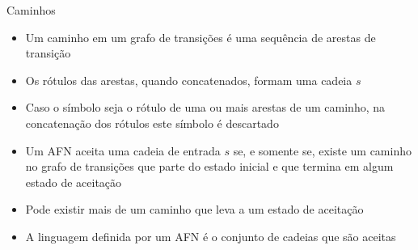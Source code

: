\begin{frame}[fragile]{Caminhos}

    \begin{itemize}
        \item Um caminho em um grafo de transições é uma sequência de arestas de transição

        \item Os rótulos das arestas, quando concatenados, formam uma cadeia $s$

        \item Caso o símbolo  seja o rótulo de uma ou mais arestas de um caminho, na concatenação dos rótulos este símbolo é descartado

        \item Um AFN aceita uma cadeia de entrada $s$ se, e somente se, existe um caminho no grafo de transições que parte do estado inicial e que termina em 
            algum estado de aceitação

        \item Pode existir mais de um caminho que leva a um estado de aceitação

        \item A linguagem definida por um AFN é o conjunto de cadeias que são aceitas
    \end{itemize}

\end{frame}

